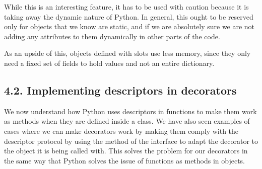 \documentclass[a4paper,10pt,english]{sphinxmanual}
\begin{document}
\begin{sphinxVerbatim}[commandchars=\\\{\}]
 
       
       
          
          

     
         
\end{sphinxVerbatim}

While this is an interesting feature, it has to be used with caution because it is taking away
the dynamic nature of Python. In general, this ought to be reserved only for objects that we
know are static, and if we are absolutely sure we are not adding any attributes to them
dynamically in other parts of the code.

As an upside of this, objects defined with slots use less memory, since they only need a
fixed set of fields to hold values and not an entire dictionary.


\subsection{4.2. Implementing descriptors in decorators}
\label{\detokenize{chapters/6_descriptors/index:implementing-descriptors-in-decorators}}
We now understand how Python uses descriptors in functions to make them work as
methods when they are defined inside a class. We have also seen examples of cases where
we can make decorators work by making them comply with the descriptor protocol by
using the  method of the interface to adapt the decorator to the object it is being
called with. This solves the problem for our decorators in the same way that Python solves
the issue of functions as methods in objects.
\end{document}
